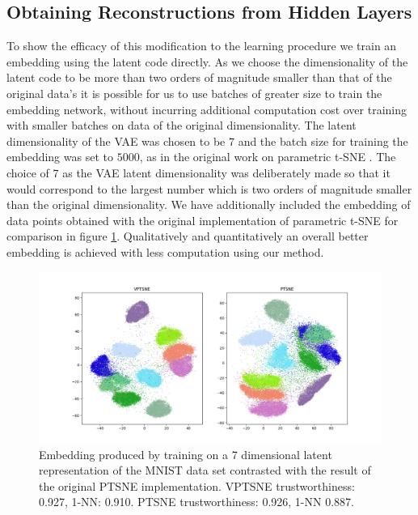 \subsection{Obtaining Reconstructions from Hidden Layers}

To show the efficacy of this modification to the learning procedure we train an embedding using the latent code directly. As we choose the dimensionality of the latent code to be more than two orders of magnitude smaller than that of the original data's it is possible for us to use batches of greater size to train the embedding network, without incurring additional computation cost over training with smaller batches on data of the original dimensionality. The latent dimensionality of the VAE was chosen to be $7$ and the batch size for training the embedding was set to $5000$, as in the original work on parametric t-SNE \cite{parametric_tsne}. The choice of $7$ as the VAE latent dimensionality was deliberately made so that it would correspond to the largest number which is two orders of magnitude smaller than the original dimensionality. We have additionally included the embedding of data points obtained with the original implementation of parametric t-SNE for comparison in figure \ref{fig:hidden_layer}. Qualitatively and quantitatively an overall better embedding is achieved with less computation using our method.

\begin{figure}[!htb]
  \centering
  \includegraphics[width=\textwidth]{images/vptsne_vs_original_ptsne_7.png}
  \caption{Embedding produced by training on a 7 dimensional latent representation of the MNIST data set contrasted with the result of the original PTSNE implementation. VPTSNE trustworthiness: 0.927, 1-NN: 0.910. PTSNE trustworthiness: 0.926, 1-NN 0.887.}
  \label{fig:hidden_layer}
\end{figure}

